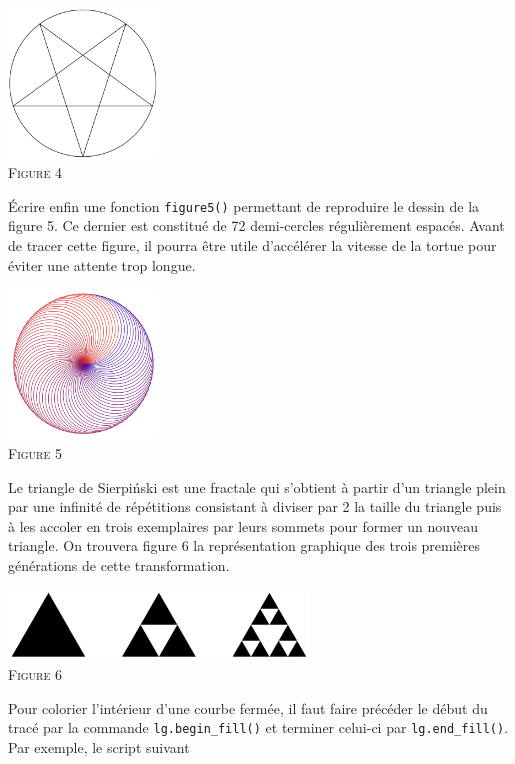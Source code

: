\documentclass{magnoliaold}
\begin{document}
\begin{questions}
\begin{center}
\includegraphics[width=0.3\textwidth]{../../commun/images/python-tp-logo-4}\\
\textsc{Figure 4}
\end{center} 
\question Écrire enfin une fonction \verb!figure5()! permettant de reproduire
  le dessin de la figure 5. Ce dernier est constitué de 72 demi-cercles
  régulièrement espacés. Avant de tracer cette figure, il pourra être utile d'accélérer la vitesse de la tortue
  pour éviter une attente trop longue.
\begin{center}
\includegraphics[width=0.3\textwidth]{../../commun/images/python-tp-logo-5}\\
\textsc{Figure 5}
\end{center}
\enonce Le triangle de Sierpi\'nski est une fractale qui s'obtient à partir d'un triangle plein par une infinité de
  répétitions consistant à diviser par 2 la taille du triangle puis à les accoler en trois exemplaires par leurs
  sommets pour former un nouveau triangle. On trouvera figure 6 la représentation graphique des trois premières
  générations de cette transformation.
\begin{center}
\includegraphics[width=0.6\textwidth]{../../commun/images/python-tp-logo-6}\\
\textsc{Figure 6}
\end{center}
Pour colorier l'intérieur d'une courbe fermée, il faut faire précéder le début du tracé par la commande
\verb!lg.begin_fill()! et terminer celui-ci par \verb!lg.end_fill()!. Par exemple, le script suivant

\end{questions}
\end{document}
